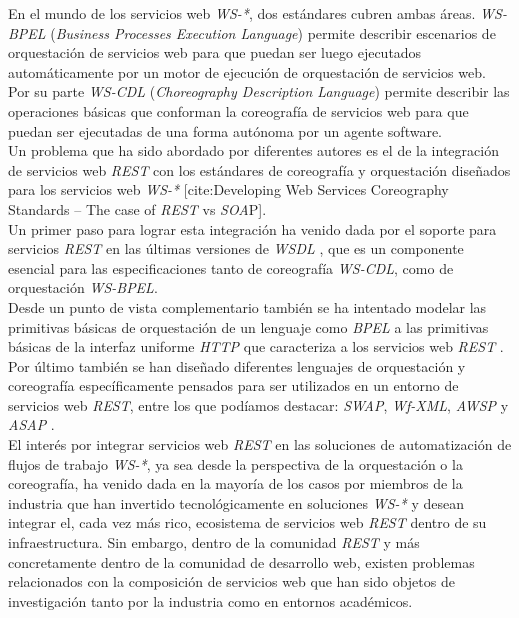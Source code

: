 En el mundo de los servicios web \textit{WS-*}, dos est\'andares cubren ambas \'areas. \textit{WS-BPEL} (\textit{Business Processes Execution Language}) \cite{wsbpel} permite describir escenarios de orquestaci\'on de servicios web para que puedan ser luego ejecutados autom\'aticamente por un motor de ejecuci\'on de orquestaci\'on de servicios web. Por su parte \textit{WS-CDL} (\textit{Choreography Description Language}) \cite{wscdl} permite describir las operaciones b\'asicas que conforman la coreograf\'ia de servicios web para que puedan ser ejecutadas de una forma aut\'onoma por un agente software.\\
Un problema que ha sido abordado por diferentes autores es el de la integraci\'on de servicios web \textit{REST} con los est\'andares de coreograf\'ia y orquestaci\'on dise\~nados para los servicios web \textit{WS-*} [cite:Developing Web Services Coreography Standards – The case of \textit{REST} vs \textit{SOA}P].\\

Un primer paso para lograr esta integraci\'on ha venido dada por el soporte para servicios \textit{REST} en las \'ultimas versiones de \textit{WSDL} \cite{takase2008definition}, que es un componente esencial para las especificaciones tanto de coreograf\'ia \textit{WS-CDL}, como de orquestaci\'on \textit{WS-BPEL}.\\

Desde un punto de vista complementario tambi\'en se ha intentado modelar las primitivas b\'asicas de orquestaci\'on de un lenguaje como \textit{BPEL} a las primitivas b\'asicas de la interfaz uniforme \textit{HTTP} que caracteriza a los servicios web \textit{REST} \cite{pautasso2010restful}.\\

Por \'ultimo tambi\'en se han dise\~nado diferentes lenguajes de orquestaci\'on y coreograf\'ia espec\'ificamente pensados para ser utilizados en un entorno de servicios web \textit{REST}, entre los que pod\'iamos destacar: \textit{SWAP}, \textit{Wf-XML}, \textit{AWSP} y \textit{ASAP} \cite{zur2005developing}.\\

El inter\'es por integrar servicios web \textit{REST} en las soluciones de automatizaci\'on de flujos de trabajo \textit{WS-*}, ya sea desde la perspectiva de la orquestaci\'on o la coreograf\'ia, ha venido dada en la mayor\'ia de los casos por miembros de la industria que han invertido tecnol\'ogicamente en soluciones \textit{WS-*} y desean integrar el, cada vez m\'as rico, ecosistema de servicios web \textit{REST} dentro de su infraestructura. Sin embargo, dentro de la comunidad \textit{REST} y m\'as concretamente dentro de la comunidad de desarrollo web, existen problemas relacionados con la composici\'on de servicios web que han sido objetos de investigaci\'on tanto por la industria como en entornos acad\'emicos.\\

